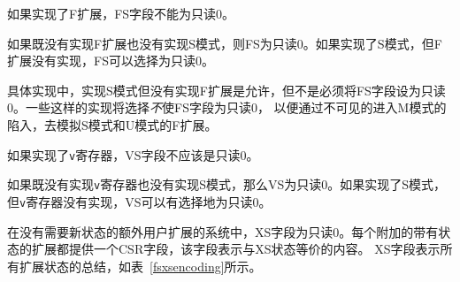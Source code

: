 \iffalse
If the F extension is implemented, the FS field shall not be
read-only zero.

If neither the F extension nor S-mode is implemented, then FS is
read-only zero.
If S-mode is implemented but the F extension is not, FS may optionally
be read-only zero.
\fi

如果实现了F扩展，FS字段不能为只读0。

如果既没有实现F扩展也没有实现S模式，则FS为只读0。如果实现了S模式，但F扩展没有实现，FS可以选择为只读0。

\iffalse
\begin{commentary}
Implementations with S-mode but without the F extension are
permitted, but not required, to make the FS field be read-only zero.
Some such implementations will choose {\em not} to have the FS
field be read-only zero, so as to enable emulation of the F extension for
both S-mode and U-mode via invisible traps into M-mode.
\end{commentary}
\fi

\begin{commentary}
具体实现中，实现S模式但没有实现F扩展是允许，但不是必须将FS字段设为只读0。一些这样的实现将选择{\em 不}使FS字段为只读0，
以便通过不可见的进入M模式的陷入，去模拟S模式和U模式的F扩展。
\end{commentary}

\iffalse
If the {\tt v} registers are implemented, the VS field shall not be
read-only zero.

If neither the {\tt v} registers nor S-mode is implemented, then VS
is read-only zero.
If S-mode is implemented but the {\tt v} registers are not, VS may
optionally be read-only zero.

In systems without additional user extensions requiring new state, the
XS field is read-only zero.  Every additional extension with state
provides a CSR field that encodes the equivalent of the XS states.
The XS field represents a summary of all
extensions' status as shown in Table~\ref{fsxsencoding}.
\fi

如果实现了{\tt v}寄存器，VS字段不应该是只读0。

如果既没有实现{\tt v}寄存器也没有实现S模式，那么VS为只读0。如果实现了S模式，但{\tt v}寄存器没有实现，VS可以有选择地为只读0。

在没有需要新状态的额外用户扩展的系统中，XS字段为只读0。每个附加的带有状态的扩展都提供一个CSR字段，该字段表示与XS状态等价的内容。
XS字段表示所有扩展状态的总结，如表~\ref{fsxsencoding}所示。

\iffalse
\begin{commentary}
The XS field effectively reports the maximum status value across all
user-extension status fields, though individual extensions can use a
different encoding than XS.
\end{commentary}
\fi

